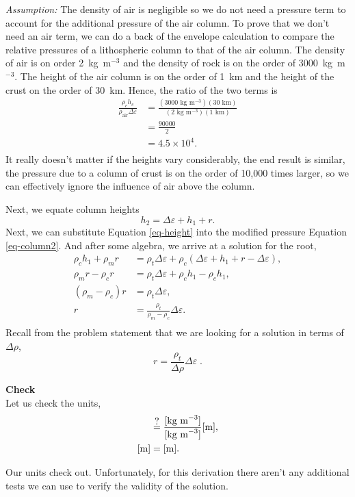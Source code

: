 \documentclass[final,a4paper,12pt]{article}
\newcommand\qeq{\stackrel{\mathclap{\normalfont\mbox{?}}}{=}}
\begin{document}
\begin{framed}
{\it Assumption:} The density of air is negligible so we do not need a pressure
term to account for the additional pressure of the air column.  To prove that we
don't need an air term, we can do a back of the envelope calculation to compare
the relative pressures of a lithospheric column to that of the air column.  The
density of air is on order 2~kg~m$^{-3}$ and the density of rock is on the order
of 3000~kg~m$^{-3}$.  The height of the air column is on the order of 1~km and
the height of the crust on the order of 30~km.  Hence, the ratio of the two
terms is
\begin{align*}
    \frac{\rho_c h_c}{\rho_{\text{air}} \Delta \varepsilon} &=
    \frac{(3000\text{ kg m$^{-3}$})(30\text{ km})}
    {(2\text{ kg m$^{-3}$})(1\text{ km})} \\
    &= \frac{90000}{2}\\
    &= 4.5 \times 10^{4}. \\
\end{align*}
It really doesn't matter if the heights vary considerably, the end result is
similar, the pressure due to a column of crust is on the order of 10,000 times
larger, so we can effectively ignore the influence of air above the column.
\end{framed}

Next, we equate column heights
\begin{equation}
    h_{2} = \Delta \varepsilon + h_{1} + r .
    \label{eq-height}
\end{equation}
Next, we can substitute Equation \ref{eq-height} into the modified pressure
Equation \ref{eq-column2}.  And after some algebra, we arrive at a solution for
the root,
\begin{align*}
    \rho_{c} h_{1} + \rho_{m} r &= \rho_{t} \Delta \varepsilon
        + \rho_{c}(\Delta \varepsilon + h_{1} + r - \Delta \varepsilon), \\
    \rho_{m} r - \rho_{c} r &= \rho_{t} \Delta \varepsilon 
        + \rho_{c} h_{1} - \rho_{c} h_{1}, \\
    (\rho_{m} - \rho_{c}) r &= \rho_{t} \Delta \varepsilon, \\
    r &= \frac{\rho_{t}}{\rho_{m} - \rho_{c}} \Delta \varepsilon. \\
\end{align*}
Recall from the problem statement that we are looking for a solution in terms of
$\Delta \rho$,
\begin{equation*}
\boxed{
    r = \frac{\rho_{t}}{\Delta \rho} \Delta \varepsilon
}\; .
\end{equation*}

{\bf Check}\\
Let us check the units,
\begin{align*}
    [\text{m}] &\qeq \frac{[\text{kg m}^{-3}]}{[\text{kg m}^{-3}]} [\text{m}], \\
    [\text{m}] &= [\text{m}].
\end{align*}

Our units check out.  Unfortunately, for this derivation there aren't any
additional tests we can use to verify the validity of the solution.
\end{document}
